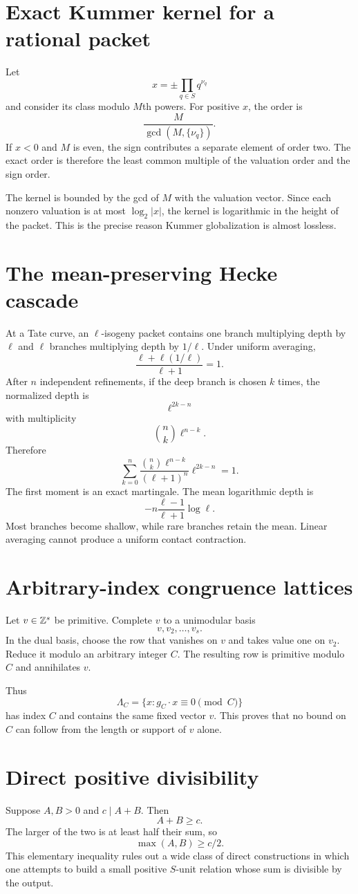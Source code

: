 \section{Exact Kummer kernel for a rational packet}
Let
\[
 x=\pm\prod_{q\in S}q^{\nu_q}
\]
and consider its class modulo $M$th powers. For positive $x$, the order is
\[
 \frac{M}{\gcd(M,\{\nu_q\})}.
\]
If $x<0$ and $M$ is even, the sign contributes a separate element of order two. The exact order is therefore the least common multiple of the valuation order and the sign order.

The kernel is bounded by the gcd of $M$ with the valuation vector. Since each nonzero valuation is at most $\log_2|x|$, the kernel is logarithmic in the height of the packet. This is the precise reason Kummer globalization is almost lossless.

\section{The mean-preserving Hecke cascade}
At a Tate curve, an $\ell$-isogeny packet contains one branch multiplying depth by $\ell$ and $\ell$ branches multiplying depth by $1/\ell$. Under uniform averaging,
\[
 \frac{\ell+\ell(1/\ell)}{\ell+1}=1.
\]
After $n$ independent refinements, if the deep branch is chosen $k$ times, the normalized depth is
\[
 \ell^{2k-n}
\]
with multiplicity
\[
 \binom nk\ell^{n-k}.
\]
Therefore
\[
 \sum_{k=0}^n
 \frac{\binom nk\ell^{n-k}}{(\ell+1)^n}
 \ell^{2k-n}
 =1.
\]
The first moment is an exact martingale. The mean logarithmic depth is
\[
 -n\frac{\ell-1}{\ell+1}\log\ell.
\]
Most branches become shallow, while rare branches retain the mean. Linear averaging cannot produce a uniform contact contraction.

\section{Arbitrary-index congruence lattices}
Let $v\in\mathbb Z^s$ be primitive. Complete $v$ to a unimodular basis
\[
 v,v_2,\ldots,v_s.
\]
In the dual basis, choose the row that vanishes on $v$ and takes value one on $v_2$. Reduce it modulo an arbitrary integer $C$. The resulting row is primitive modulo $C$ and annihilates $v$.

Thus
\[
 \Lambda_C
 =
 \{x:g_C\cdot x\equiv0\pmod C\}
\]
has index $C$ and contains the same fixed vector $v$. This proves that no bound on $C$ can follow from the length or support of $v$ alone.

\section{Direct positive divisibility}
Suppose $A,B>0$ and $c\mid A+B$. Then
\[
 A+B\ge c.
\]
The larger of the two is at least half their sum, so
\[
 \max(A,B)\ge c/2.
\]
This elementary inequality rules out a wide class of direct constructions in which one attempts to build a small positive $S$-unit relation whose sum is divisible by the output.

